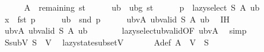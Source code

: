 \begin{isabellebody}
\ \ \ \ \isamarkupfalse%
\ {\isacharquery}{\kern0pt}A\ {\isacharequal}{\kern0pt}\ {\isachardoublequoteopen}remaining\ {\isacharquery}{\kern0pt}st{\isachardoublequoteclose}\isanewline
\ \ \ \ \isamarkupfalse%
\ {\isacharquery}{\kern0pt}ub\ {\isacharequal}{\kern0pt}\ {\isachardoublequoteopen}ubg\ {\isacharquery}{\kern0pt}st{\isachardoublequoteclose}\isanewline
\ \ \ \ \isamarkupfalse%
\ {\isacharquery}{\kern0pt}p\ {\isacharequal}{\kern0pt}\ {\isachardoublequoteopen}lazy{\isacharunderscore}{\kern0pt}select\ {\isacharquery}{\kern0pt}S\ {\isacharquery}{\kern0pt}A\ {\isacharquery}{\kern0pt}ub{\isachardoublequoteclose}\isanewline
\ \ \ \ \isamarkupfalse%
\ {\isacharquery}{\kern0pt}x\ {\isacharequal}{\kern0pt}\ {\isachardoublequoteopen}fst\ {\isacharquery}{\kern0pt}p{\isachardoublequoteclose}\isanewline
\ \ \ \ \isamarkupfalse%
\ {\isacharquery}{\kern0pt}ub{\isacharprime}{\kern0pt}\ {\isacharequal}{\kern0pt}\ {\isachardoublequoteopen}snd\ {\isacharquery}{\kern0pt}p{\isachardoublequoteclose}\isanewline
\isanewline
\ \ \ \ \isamarkupfalse%
\ ubvA{\isacharcolon}{\kern0pt}\ {\isachardoublequoteopen}ub{\isacharunderscore}{\kern0pt}valid\ {\isacharquery}{\kern0pt}S\ {\isacharquery}{\kern0pt}A\ {\isacharquery}{\kern0pt}ub{\isachardoublequoteclose}\ \isamarkupfalse%
\ IH\ \isakeywordONE{{\isachardot}{\kern0pt}}\isamarkupfalse%
\isanewline
\ \ \ \ \isamarkupfalse%
\ ubvA{\isacharprime}{\kern0pt}{\isacharcolon}{\kern0pt}\ {\isachardoublequoteopen}ub{\isacharunderscore}{\kern0pt}valid\ {\isacharquery}{\kern0pt}S\ {\isacharquery}{\kern0pt}A\ {\isacharquery}{\kern0pt}ub{\isacharprime}{\kern0pt}{\isachardoublequoteclose}\isanewline
\ \ \ \ \ \ \isamarkupfalse%
\ lazy{\isacharunderscore}{\kern0pt}select{\isacharunderscore}{\kern0pt}ub{\isacharunderscore}{\kern0pt}valid{\isacharbrackleft}{\kern0pt}OF\ ubvA{\isacharbrackright}{\kern0pt}\ \isamarkupfalse%
\ simp\isanewline
\isanewline
\ \ \ \ \isamarkupfalse%
\ SsubV{\isacharcolon}{\kern0pt}\ {\isachardoublequoteopen}{\isacharquery}{\kern0pt}S\ {\isasymsubseteq}\ V{\isachardoublequoteclose}\ \isamarkupfalse%
\ lazy{\isacharunderscore}{\kern0pt}state{\isacharunderscore}{\kern0pt}subset{\isacharunderscore}{\kern0pt}V\ \isakeywordONE{{\isachardot}{\kern0pt}}\isamarkupfalse%
\isanewline
\ \ \ \ \isamarkupfalse%
\ A{\isacharunderscore}{\kern0pt}def{\isacharcolon}{\kern0pt}\ {\isachardoublequoteopen}{\isacharquery}{\kern0pt}A\ {\isacharequal}{\kern0pt}\ V\ {\isacharminus}{\kern0pt}\ {\isacharquery}{\kern0pt}S{\isachardoublequoteclose}\ \isamarkupfalse%

\end{isabellebody}
